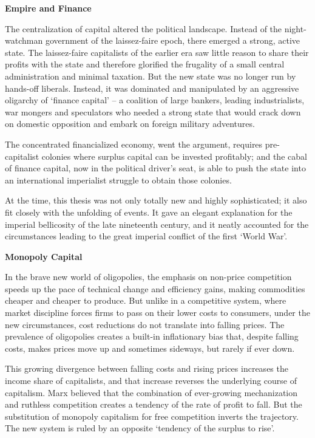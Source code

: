 \documentclass[
]{book}
\begin{document}
\textbf{Empire and Finance}

The centralization of capital altered the political landscape. Instead of
the night-watchman government of the laissez-faire epoch, there emerged a strong, active
state.
The laissez-faire capitalists of the earlier era saw little reason to share their profits
with the state and therefore glorified the frugality of a small central administration and
minimal taxation. But the new state was no longer run by hands-off liberals. Instead, it was
dominated and manipulated by an aggressive oligarchy of `finance capital' -- a coalition of
large bankers, leading industrialists, war mongers and speculators who needed a strong
state that would crack down on domestic opposition and embark on foreign military
adventures.

The concentrated financialized economy, went the argument, requires pre-capitalist colonies
where surplus capital can be invested profitably; and the cabal of finance capital, now in
the political driver's seat, is able to push the state into an international imperialist
struggle to obtain those colonies.

At the time, this thesis was not only totally new and highly sophisticated; it also
fit closely with the unfolding of events. It gave an elegant explanation for the imperial
bellicosity of the late nineteenth century, and it neatly accounted for the circumstances
leading to the great imperial conflict of the first `World War'.

\textbf{Monopoly Capital}

In the brave new world of oligopolies, the emphasis on non-price competition
speeds up the pace of technical change and efficiency gains, making commodities cheaper
and cheaper to produce. But unlike in a competitive system, where market discipline
forces firms to pass on their lower costs to consumers, under the new circumstances, cost
reductions do not translate into falling prices. The prevalence of oligopolies creates a
built-in inflationary bias that, despite falling costs, makes prices move up and sometimes
sideways, but rarely if ever down.

This growing divergence between falling costs and rising prices increases the
income share of capitalists, and that increase reverses the underlying course of capitalism.
Marx believed that the combination of ever-growing mechanization and ruthless
competition creates a tendency of the rate of profit to fall. But the substitution of
monopoly capitalism for free competition inverts the trajectory. The new system
is ruled by an opposite `tendency of the surplus to rise'.
\end{document}
